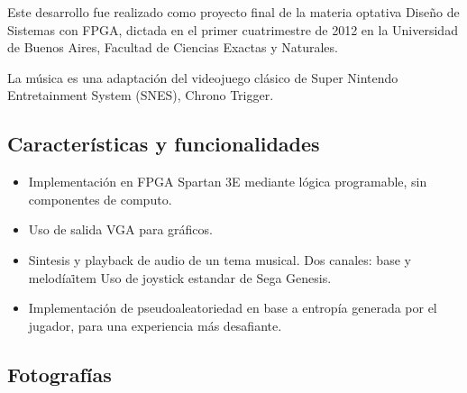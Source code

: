 \documentclass[10pt, a4paper,english,spanish]{article}
\begin{document}
Este desarrollo fue realizado como proyecto final de la materia optativa
Diseño de Sistemas con FPGA, dictada en el primer cuatrimestre de 2012
en la Universidad de Buenos Aires, Facultad de Ciencias Exactas y
Naturales.

La música es una adaptación del videojuego clásico de Super Nintendo
Entretainment System (SNES), Chrono Trigger.

\subsection{Caracter\'isticas y funcionalidades}

\begin{itemize}
	\item Implementación en FPGA Spartan 3E mediante lógica programable, sin 
	componentes de computo.
	\item Uso de salida VGA para gráficos.
	\item Sintesis y playback de audio de un tema musical. Dos canales: base y
	melod\'ia\.
	item Uso de joystick estandar de Sega Genesis.
	\item Implementación de pseudoaleatoriedad en base a entropía generada por 
	el jugador, para una experiencia más desafiante.
\end{itemize}

\subsection{Fotograf\'ias}
\end{document}
